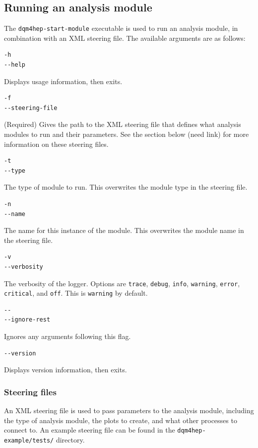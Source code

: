 \subsection{Running an analysis module}
The \texttt{dqm4hep-start-module} executable is used to run an analysis module, in combination with an XML steering file. The available arguments are as follows:

\begin{lstlisting}
-h
--help
\end{lstlisting}

Displays usage information, then exits.

\begin{lstlisting}
-f
--steering-file
\end{lstlisting}

(Required) Gives the path to the XML steering file that defines what analysis modules to run and their parameters. See the section below (need link) for more information on these steering files. 

\begin{lstlisting}
-t
--type
\end{lstlisting}

The type of module to run. This overwrites the module type in the steering file.

\begin{lstlisting}
-n
--name
\end{lstlisting}

The name for this instance of the module. This overwrites the module name in the steering file.

\begin{lstlisting}
-v
--verbosity
\end{lstlisting}

The verbosity of the logger. Options are \texttt{trace}, \texttt{debug}, \texttt{info}, \texttt{warning}, \texttt{error}, \texttt{critical}, and \texttt{off}. This is \texttt{warning} by default.

\begin{lstlisting}
--
--ignore-rest
\end{lstlisting}

Ignores any arguments following this flag.

\begin{lstlisting}
--version
\end{lstlisting}

Displays version information, then exits.

\subsubsection{Steering files}
An \acrshort{XML} steering file is used to pass parameters to the analysis module, including the type of analysis module, the plots to create, and what other processes to connect to. An example steering file can be found in the \texttt{dqm4hep-example/tests/} directory.


